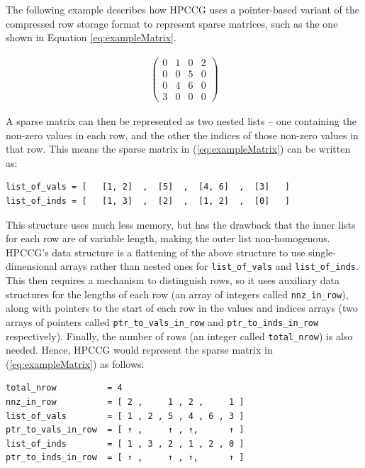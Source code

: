The following example describes how HPCCG uses a pointer-based variant of the compressed row storage format to represent sparse matrices, such as the one shown in Equation \ref{eq:exampleMatrix}.

\begin{align}
    \begin{pmatrix}
        0 & 1 & 0 & 2 \\
        0 & 0 & 5 & 0 \\
        0 & 4 & 6 & 0 \\
        3 & 0 & 0 & 0
    \end{pmatrix}
    \label{eq:exampleMatrix}
\end{align}

A sparse matrix can then be represented as two nested lists -- one containing the non-zero values in each row, and the other the indices of those non-zero values in that row. This means the sparse matrix in (\ref{eq:exampleMatrix}) can be written as:

\begin{verbatim}
list_of_vals = [   [1, 2]  ,  [5]  ,  [4, 6]  ,  [3]   ]
list_of_inds = [   [1, 3]  ,  [2]  ,  [1, 2]  ,  [0]   ]
\end{verbatim}

This structure uses much less memory, but has the drawback that the inner lists for each row are of variable length, making the outer list non-homogenous. HPCCG's data structure is a flattening of the above structure to use single-dimensional arrays rather than nested ones for \texttt{list\_of\_vals} and \texttt{list\_of\_inds}. This then requires a mechanism to distinguish rows, so it uses auxiliary data structures for the lengths of each row (an array of integers called \texttt{nnz\_in\_row}), along with pointers to the start of each row in the values and indices arrays (two arrays of pointers called \texttt{ptr\_to\_vals\_in\_row} and \texttt{ptr\_to\_inds\_in\_row} respectively). Finally, the number of rows (an integer called \texttt{total\_nrow}) is also needed. Hence, HPCCG would represent the sparse matrix in (\ref{eq:exampleMatrix}) as follows:

\begin{verbatim}
total_nrow          = 4
nnz_in_row          = [ 2 ,     1 , 2 ,     1 ]
list_of_vals        = [ 1 , 2 , 5 , 4 , 6 , 3 ]
ptr_to_vals_in_row  = [ ↑ ,     ↑ , ↑,      ↑ ]
list_of_inds        = [ 1 , 3 , 2 , 1 , 2 , 0 ]
ptr_to_inds_in_row  = [ ↑ ,     ↑ , ↑,      ↑ ]
\end{verbatim}

